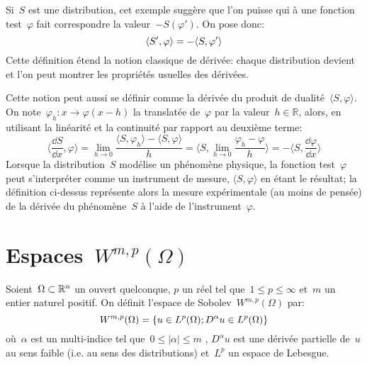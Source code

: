 \medskip
\begin{definition}
Si~$S$ est une distribution, cet exemple suggère que l'on puisse  qui à une fonction test~$\varphi$ fait correspondre la valeur~$- S(\varphi')$. On pose donc:
\begin{equation}\colorred
  \langle S', \varphi \rangle = - \langle S, \varphi' \rangle
\end{equation}
Cette définition étend la notion classique de dérivée: chaque distribution devient  et l'on peut montrer les propriétés usuelles des dérivées.
\end{definition}

\medskip
Cette notion peut aussi se définir comme la dérivée du produit de dualité~$\langle S,\varphi\rangle$.
On note~$\varphi_h:x\rightarrow\varphi(x-h)$ la translatée de~$\varphi$ par la valeur~$h\in{\mathbb R}$, alors, en utilisant la linéarité et la continuité par rapport au deuxième terme:
\begin{equation}
\langle\frac{\dd S}{\dd x},\varphi\rangle= \lim_{h\rightarrow 0}\frac{ \langle S,\varphi_h\rangle- \langle S,\varphi\rangle}{h}
= \langle S,\lim_{h\rightarrow 0} \frac{\varphi_h-\varphi}{h} \rangle= -\langle S,\frac{\dd\varphi}{\dd x}\rangle
\end{equation}
Lorsque la distribution~$S$ modélise un phénomène physique, la fonction test~$\varphi$ peut s'interpréter comme un instrument de mesure, $\langle S,\varphi\rangle$ en étant le résultat; la définition ci-dessus représente alors la mesure expérimentale (au moins de pensée) de la dérivée du phénomène~$S$ à l'aide de l'instrument~$\varphi$.

\medskip
{}





\medskip
\section{Espaces~$W^{m,p}(\Omega)$}

\begin{definition}
Soient~$\Omega \subset \mathbb R^n$ un ouvert quelconque, $p$ un réel tel que~$1\leqslant p\leqslant \infty$ et~$m$ un entier naturel positif.
On définit l'espace de Sobolev~$W^{m,p}(\Omega)$ par:
\begin{equation}\label{Eq-SoboW}\colorred
W^{m, p}(\Omega)=\{u\in L^p(\Omega); D^\alpha u \in L^p(\Omega)\}
\end{equation}
où~$\alpha$ est un multi-indice tel que~$0\leqslant |\alpha| \leqslant m$ , $D^\alpha u$ est une dérivée partielle de~$u$ au sens faible (i.e. au sens des distributions) et~$L^p$ un espace de Lebesgue.
\end{definition}

